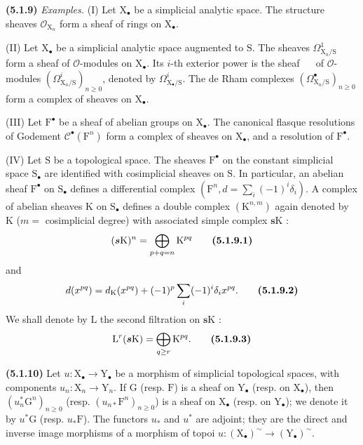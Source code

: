 \documentclass[11pt,leqno]{article}
\newcommand{\Page}[1]{\ifvmode\noindent\else\unskip\ \fi{\footnotesize\textcolor{gray}{[p.\,#1]}}\ \ignorespaces}
\begin{document}
\textbf{(5.1.9)} \textit{Examples.} (I) Let \(\mathrm{X}_{\bullet}\) be a simplicial analytic space. The structure sheaves \(\mathscr{O}_{\mathrm{X}_n}\) form a sheaf of rings on \(\mathrm{X}_{\bullet}\).

(II) Let \(\mathrm{X}_{\bullet}\) be a simplicial analytic space augmented to \(\mathrm{S}\). The sheaves \(\Omega^1_{\mathrm{X}_n/\mathrm{S}}\) form a sheaf of \(\mathscr{O}\)-modules on \(\mathrm{X}_{\bullet}\). Its \(i\)-th exterior power is the sheaf
\Page{11}
of \(\mathscr{O}\)-modules \((\Omega^i_{\mathrm{X}_n/\mathrm{S}})_{n\geq0}\), denoted by \(\Omega^i_{\mathrm{X}_{\bullet}/\mathrm{S}}\). The de Rham complexes \((\Omega^{\bullet}_{\mathrm{X}_n/\mathrm{S}})_{n\geq0}\) form a complex of sheaves on \(\mathrm{X}_{\bullet}\).

(III) Let \(\mathrm{F}^{\bullet}\) be a sheaf of abelian groups on \(\mathrm{X}_{\bullet}\). The canonical flasque resolutions of Godement \(\mathscr{C}^{\bullet}(\mathrm{F}^n)\) form a complex of sheaves on \(\mathrm{X}_{\bullet}\), and a resolution of \(\mathrm{F}^{\bullet}\).

(IV) Let \(\mathrm{S}\) be a topological space. The sheaves \(\mathrm{F}^{\bullet}\) on the constant simplicial space \(\mathrm{S}_{\bullet}\) are identified with cosimplicial sheaves on \(\mathrm{S}\). In particular, an abelian sheaf \(\mathrm{F}^{\bullet}\) on \(\mathrm{S}_{\bullet}\) defines a differential complex \((\mathrm{F}^n,d=\sum\limits_i(-1)^i\delta_i)\). A complex of abelian sheaves \(\mathrm{K}\) on \(\mathrm{S}_{\bullet}\) defines a double complex \((\mathrm{K}^{n,m})\) again denoted by \(\mathrm{K}\) (\(m=\) cosimplicial degree) with associated simple complex \(\boldsymbol{s}\mathrm{K}\) :
\[
(\boldsymbol{s}\mathrm{K})^n
=\bigoplus_{p+q=n}\mathrm{K}^{pq}
\tag*{\textbf{(5.1.9.1)}}
\]
and
\[
d(x^{pq})=d_{\mathrm{K}}(x^{pq})
+(-1)^p\sum_i(-1)^i\delta_i x^{pq}.
\tag*{\textbf{(5.1.9.2)}}
\]
We shall denote by \(\mathrm{L}\) the second filtration on \(\boldsymbol{s}\mathrm{K}\) :
\[
\mathrm{L}^r(\boldsymbol{s}\mathrm{K})
=\bigoplus_{q\geq r}\mathrm{K}^{pq}.
\tag*{\textbf{(5.1.9.3)}}
\]

\textbf{(5.1.10)} Let \(u:\mathrm{X}_{\bullet}\to\mathrm{Y}_{\bullet}\) be a morphism of simplicial topological spaces, with components \(u_n:\mathrm{X}_n\to\mathrm{Y}_n\). If \(\mathrm{G}\) (resp. \(\mathrm{F}\)) is a sheaf on \(\mathrm{Y}_{\bullet}\) (resp. on \(\mathrm{X}_{\bullet}\)), then \((u_n^*\mathrm{G}^n)_{n\geq0}\) (resp. \((u_{n*}\mathrm{F}^n)_{n\geq0}\)) is a sheaf on \(\mathrm{X}_{\bullet}\) (resp. on \(\mathrm{Y}_{\bullet}\)); we denote it by \(u^*\mathrm{G}\) (resp. \(u_*\mathrm{F}\)). The functors \(u_*\) and \(u^*\) are adjoint; they are the direct and inverse image morphisms of a morphism of topoi \(u:(\mathrm{X}_{\bullet})^{\sim}\to(\mathrm{Y}_{\bullet})^{\sim}\).
\end{document}
